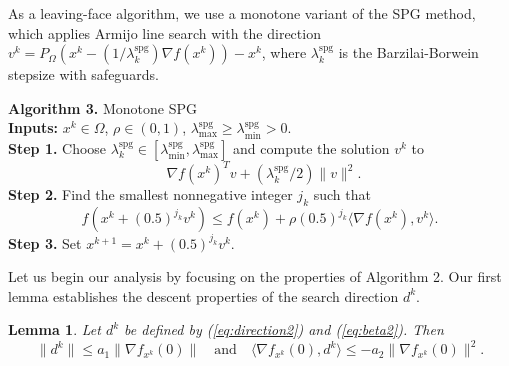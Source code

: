 \documentclass[11pt]{article}
\newtheorem{lemma}[theorem]{Lemma}
\begin{document}
As a leaving-face algorithm, we use a monotone variant of the SPG method, which applies Armijo line search with the direction $v^{k} = P_{\Omega} \left( x^{k} - (1/\lambda_{k}^{\mathrm{spg}}) \nabla f(x^{k}) \right) - x^{k}$, where \(\lambda_{k}^{\mathrm{spg}}\) is the Barzilai-Borwein stepsize with safeguards.

\begin{mdframed}
\noindent\textbf{Algorithm 3.} Monotone SPG \cite{bmcomper}
\\[0.2cm]
\noindent\textbf{Inputs:} $x^{k}\in\Omega$, $\rho\in (0,1)$, $\lambda_{\max}^{\mathrm{spg}} \geq \lambda_{\min}^{\mathrm{spg}}>0$.
\\[0.2cm]
 \noindent\textbf{Step 1.} Choose $\lambda_{k}^{\mathrm{spg}} \in \left[\lambda_{\min}^{\mathrm{spg}}, \lambda_{\max}^{\mathrm{spg}}\right]$ and compute the solution $v^{k}$ to 
\[
\mathop{\min_{v\in\Omega\setminus\{x^{k}\}}} \nabla f(x^{k})^{T}v + (\lambda_{k}^{\mathrm{spg}}/2) \|v\|^{2}.
\]
\noindent\textbf{Step 2.} Find the smallest nonnegative integer $j_{k}$ such that
\[
f(x^{k}+(0.5)^{j_{k}} v^{k})\leq f(x^{k})+\rho (0.5)^{j_{k}}\langle\nabla f(x^{k}),v^{k}\rangle.
\]
\noindent\textbf{Step 3.} Set $x^{k+1}=x^{k}+(0.5)^{j_{k}}v^{k}$.
\end{mdframed}

Let us begin our analysis by focusing on the properties of Algorithm 2. Our first lemma establishes the descent properties of the search direction $d^{k}$.

\begin{lemma}
Let $d^{k}$ be defined by (\ref{eq:direction2}) and (\ref{eq:beta2}). Then
\begin{equation}
\|d^{k}\|\leq a_{1}\|\nabla f_{x^{k}}(0)\|\quad\text{and}\quad\langle\nabla f_{x^{k}}(0),d^{k}\rangle\leq -a_{2}\|\nabla f_{x^{k}}(0)\|^{2}.
\label{eq:2.2}
\end{equation}
\label{lem:extra1}
\end{lemma}
\end{document}
